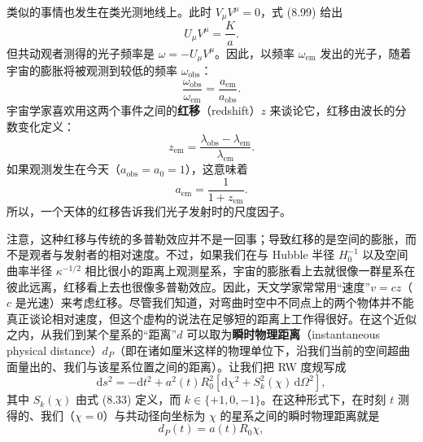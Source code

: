 类似的事情也发生在类光测地线上。此时 $V_{\mu}V^{\mu}=0$，式 (8.99) 给出
\begin{equation*}
U_{\mu}V^{\mu} = \frac{K}{a}.
\tag{8.102}
\end{equation*}
但共动观者测得的光子频率是 $\omega=-U_{\mu}V^{\mu}$。因此，以频率 $\omega_{\mathrm{em}}$ 发出的光子，随着宇宙的膨胀将被观测到较低的频率 $\omega_{\mathrm{obs}}$：
\begin{equation*}
\frac{\omega_{\mathrm{obs}}}{\omega_{\mathrm{em}}} = \frac{a_{\mathrm{em}}}{a_{\mathrm{obs}}}.
\tag{8.103}
\end{equation*}
宇宙学家喜欢用这两个事件之间的\textbf{红移}（redshift）$z$ 来谈论它，红移由波长的分数变化定义：
\begin{equation*}
z_{\mathrm{em}} = \frac{\lambda_{\mathrm{obs}} - \lambda_{\mathrm{em}}}{\lambda_{\mathrm{em}}}.
\tag{8.104}
\end{equation*}
如果观测发生在今天（$a_{\mathrm{obs}}=a_0=1$），这意味着
\begin{equation*}
\boxed{\,a_{\mathrm{em}} = \frac{1}{1+z_{\mathrm{em}}}.\,}
\tag{8.105}
\end{equation*}
所以，一个天体的红移告诉我们光子发射时的尺度因子。

注意，这种红移与传统的多普勒效应并不是一回事；导致红移的是空间的膨胀，而不是观者与发射者的相对速度。不过，如果我们在与 Hubble 半径 $H_0^{-1}$ 以及空间曲率半径 $\kappa^{-1/2}$ 相比很小的距离上观测星系，宇宙的膨胀看上去就很像一群星系在彼此远离，红移看上去也很像多普勒效应。因此，天文学家常常用“速度”$v=cz$（$c$ 是光速）来考虑红移。尽管我们知道，对弯曲时空中不同点上的两个物体并不能真正谈论相对速度，但这个虚构的说法在足够短的距离上工作得很好。在这个近似之内，从我们到某个星系的“距离”$d$ 可以取为\textbf{瞬时物理距离}（instantaneous physical distance）$d_P$（即在诸如厘米这样的物理单位下，沿我们当前的空间超曲面量出的、我们与该星系位置之间的距离）。让我们把 RW 度规写成
\begin{equation*}
\mathrm{d}s^{2} = -\mathrm{d}t^{2} + a^{2}(t)R_0^{2}\left[\mathrm{d}\chi^{2} + S_k^{2}(\chi)\,\mathrm{d}\Omega^{2}\right],
\tag{8.106}
\end{equation*}
其中 $S_k(\chi)$ 由式 (8.33) 定义，而 $k\in\{+1,0,-1\}$。在这种形式下，在时刻 $t$ 测得的、我们（$\chi=0$）与共动径向坐标为 $\chi$ 的星系之间的瞬时物理距离就是
\begin{equation*}
d_P(t) = a(t)R_0\chi,
\tag{8.107}
\end{equation*}

